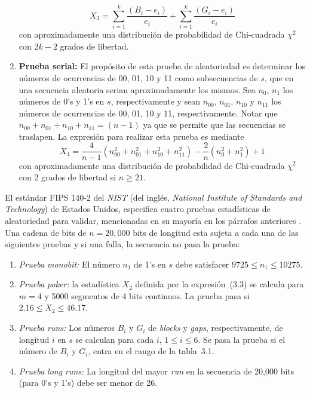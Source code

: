 \begin{enumerate}
\begin{equation}
X_{3}=\sum_{i=1}^{k} \dfrac{(B_{i}-e_{i})}{e_{i}} + \sum_{i=1}^{k} \dfrac{(G_{i}-e_{i})}{e_{i}} 
\end{equation}
con aproximadamente una distribución de probabilidad de Chi-cuadrada $\chi^{2}$ con $2k-2$ grados de libertad.
	\item \textbf{Prueba serial:} El propósito de esta prueba de aleatoriedad es determinar los números de ocurrencias de 00, 01, 10 y 11 como subsecuencias de $s$, que en una secuencia aleatoria serian aproximadamente los mismos. Sea $n_{0}$, $n_{1}$ los números de 0's y 1's en $s$, respectivamente y sean $n_{00}$, $n_{01}$, $n_{10}$ y $n_{11}$ los números de ocurrencias de 00, 01, 10 y 11, respectivamente. Notar que $n_{00}+n_{01}+n_{10}+n_{11}=(n-1)$ ya que se permite que las secuencias se traslapen. La expresión para realizar esta prueba es mediante  
\begin{equation}
X_{4}=\dfrac{4}{n-1}\left(n^{2}_{00}+n^{2}_{01}+n^{2}_{10}+n^{2}_{11}\right) - \dfrac{2}{n}\left(n^{2}_{0}+n^{2}_{1}\right)+1 
\end{equation}
con aproximadamente una distribución de probabilidad de Chi-cuadrada $\chi^{2}$ con 2 grados de libertad si $n\geq 21$. \\
\end{enumerate}   

El estándar FIPS 140-2 del \textit{NIST} (del inglés, \textit{National Institute of Standards and Technology}) de Estados Unidos, especifica cuatro pruebas estadísticas de aleatoriedad para validar, mencionadas en su mayoría en los párrafos anteriores \cite{FIPS_1994, FIPS_2001}. Una cadena de bits de $n=20,000$ bits de longitud esta sujeta a cada una de las siguientes pruebas y si una falla, la secuencia no pasa la prueba:
\begin{enumerate}
\item \textit{Prueba monobit:} El número $n_{1}$ de 1's en $s$ debe satisfacer $9725\leq n_{1} \leq 10275$.
\item \textit{Prueba poker:} la estadística $X_{2}$ definida por la expresión~(3.3) se calcula para $m=4$ y 5000 segmentos de 4 bits continuos. La prueba pasa si $2.16\leq X_{2}\leq 46.17$.
\item \textit{Prueba runs:} Los números $B_{i}$ y $G_{i}$ de \textit{blocks} y \textit{gaps}, respectivamente, de longitud $i$ en $s$ se calculan para cada $i$, $1\leq i\leq 6$. Se pasa la prueba si el número de $B_{i}$ y $G_{i}$, entra en el rango de la tabla~3.1.
\item \textit{Prueba long runs:} La longitud del mayor \textit{run} en la secuencia de 20,000 bits (para 0's y 1's) debe ser menor de 26. \\
\end{enumerate}

